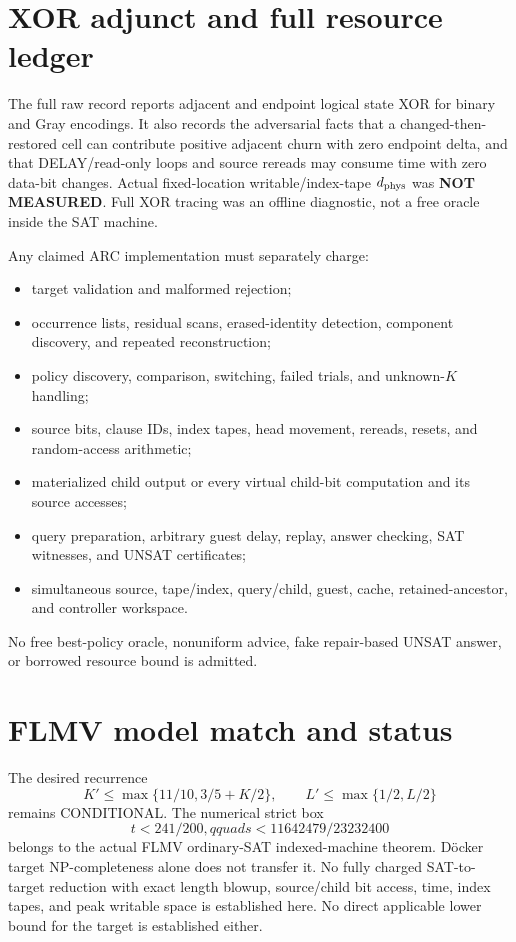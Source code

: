 \documentclass[11pt]{article}
\newcommand{\status}[1]{\textsf{#1}}
\begin{document}
\section{XOR adjunct and full resource ledger}
The full raw record reports adjacent and endpoint logical state XOR for binary and Gray encodings.  It also records the adversarial facts that a changed-then-restored cell can contribute positive adjacent churn with zero endpoint delta, and that DELAY/read-only loops and source rereads may consume time with zero data-bit changes.  Actual fixed-location writable/index-tape $d_{\rm phys}$ was \textbf{NOT MEASURED}.  Full XOR tracing was an offline diagnostic, not a free oracle inside the SAT machine.

Any claimed ARC implementation must separately charge:
\begin{itemize}
\item target validation and malformed rejection;
\item occurrence lists, residual scans, erased-identity detection, component discovery, and repeated reconstruction;
\item policy discovery, comparison, switching, failed trials, and unknown-$K$ handling;
\item source bits, clause IDs, index tapes, head movement, rereads, resets, and random-access arithmetic;
\item materialized child output or every virtual child-bit computation and its source accesses;
\item query preparation, arbitrary guest delay, replay, answer checking, SAT witnesses, and UNSAT certificates;
\item simultaneous source, tape/index, query/child, guest, cache, retained-ancestor, and controller workspace.
\end{itemize}
No free best-policy oracle, nonuniform advice, fake repair-based UNSAT answer, or borrowed resource bound is admitted.

\section{FLMV model match and status}
The desired recurrence
\[
K'\le\max\{11/10,3/5+K/2\},\qquad
L'\le\max\{1/2,L/2\}
\]
remains \status{CONDITIONAL}.  The numerical strict box
\[
t<241/200,qquad s<11642479/23232400
\]
belongs to the actual FLMV ordinary-SAT indexed-machine theorem.  D\"ocker target NP-completeness alone does not transfer it.  No fully charged SAT-to-target reduction with exact length blowup, source/child bit access, time, index tapes, and peak writable space is established here.  No direct applicable lower bound for the target is established either.
\end{document}
